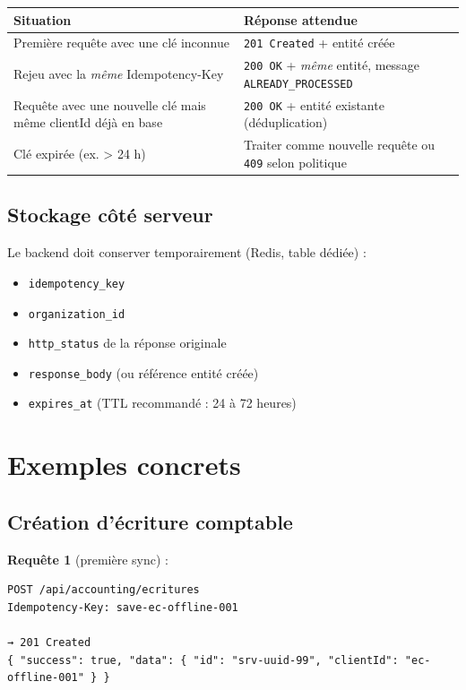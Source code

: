 \documentclass[12pt,a4paper]{report}
\begin{document}
\begin{longtable}{@{}p{4.5cm}p{8cm}@{}}
\hline
\textbf{Situation} & \textbf{Réponse attendue} \\
\hline
\endhead
Première requête avec une clé inconnue & \texttt{201 Created} + entité créée \\
\hline
Rejeu avec la \emph{même} Idempotency-Key & \texttt{200 OK} + \emph{même} entité, message \texttt{ALREADY\_PROCESSED} \\
\hline
Requête avec une nouvelle clé mais même clientId déjà en base & \texttt{200 OK} + entité existante (déduplication) \\
\hline
Clé expirée (ex. > 24 h) & Traiter comme nouvelle requête ou \texttt{409} selon politique \\
\hline
\end{longtable}

\subsection{Stockage côté serveur}

Le backend doit conserver temporairement (Redis, table dédiée) :
\begin{itemize}
  \item \texttt{idempotency\_key}
  \item \texttt{organization\_id}
  \item \texttt{http\_status} de la réponse originale
  \item \texttt{response\_body} (ou référence entité créée)
  \item \texttt{expires\_at} (TTL recommandé : 24 à 72 heures)
\end{itemize}

\section{Exemples concrets}

\subsection{Création d'écriture comptable}

\textbf{Requête 1} (première sync) :
\begin{verbatim}
POST /api/accounting/ecritures
Idempotency-Key: save-ec-offline-001

→ 201 Created
{ "success": true, "data": { "id": "srv-uuid-99", "clientId": "ec-offline-001" } }
\end{verbatim}
\end{document}
